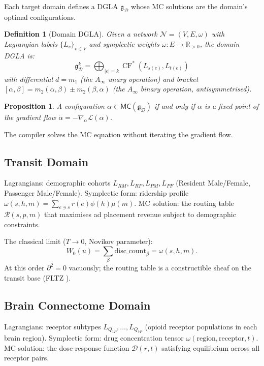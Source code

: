 \documentclass[11pt]{amsart}
\newtheorem{proposition}[theorem]{Proposition}
\newtheorem{definition}[theorem]{Definition}
\DeclareMathOperator{\CF}{CF}
\newcommand{\MC}{\mathsf{MC}}
\begin{document}
Each target domain defines a DGLA $\mathfrak{g}_\mathcal{D}$
whose MC solutions are the domain's optimal configurations.

\begin{definition}[Domain DGLA]
Given a network $\mathcal{N} = (V, E, \omega)$ with Lagrangian
labels $\{L_v\}_{v \in V}$ and symplectic weights $\omega: E \to \mathbb{R}_{>0}$,
the domain DGLA is:
\[
  \mathfrak{g}_\mathcal{D}^k = \bigoplus_{|e|=k} \CF^*(L_{s(e)}, L_{t(e)})
\]
with differential $d = m_1$ (the $A_\infty$ unary operation)
and bracket $[\alpha, \beta] = m_2(\alpha, \beta) \pm m_2(\beta, \alpha)$
(the $A_\infty$ binary operation, antisymmetrised).
\end{definition}

\begin{proposition}
A configuration $\alpha \in \MC(\mathfrak{g}_\mathcal{D})$ if and only if
$\alpha$ is a fixed point of the gradient flow
$\dot{\alpha} = -\nabla_\alpha \mathcal{L}(\alpha)$.
\end{proposition}

The compiler solves the MC equation without iterating the gradient flow.

\subsection{Transit Domain}

Lagrangians: demographic cohorts $L_{RM}, L_{RF}, L_{PM}, L_{PF}$
(Resident Male/Female, Passenger Male/Female).
Symplectic form: ridership profile $\omega(s,h,m) = \sum_{e \ni s} r(e) \phi(h) \mu(m)$.
MC solution: the routing table $\mathcal{R}(s,p,m)$ that maximises
ad placement revenue subject to demographic constraints.

The classical limit ($T \to 0$, Novikov parameter):
\[
  W_0(u) = \sum_\beta \text{disc\_count}_\beta = \omega(s,h,m).
\]
At this order $\partial^2 = 0$ vacuously; the routing table is
a constructible sheaf on the transit base (FLTZ \cite{FLTZ}).

\subsection{Brain Connectome Domain}

Lagrangians: receptor subtypes $L_{Q_{1P}}, \ldots, L_{Q_{7P}}$
(opioid receptor populations in each brain region).
Symplectic form: drug concentration tensor $\omega(\text{region}, \text{receptor}, t)$.
MC solution: the dose-response function $\mathcal{D}(r, t)$ satisfying
equilibrium across all receptor pairs.
\end{document}
